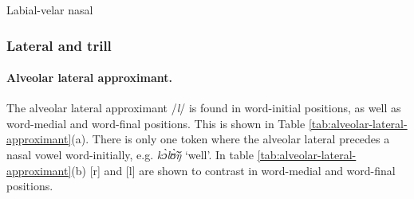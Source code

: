\begin{table}[!htb]
\small
\centering
\caption{Labial-velar nasal\label{tab:labialvelar-nasal}}

\quad
{}
\end{table}




\subsubsection{Lateral and trill}
\label{sec:approx}


\paragraph{Alveolar lateral approximant.}

The alveolar lateral approximant /{\it l}/ is found in word-initial positions, 
as well 
as word-medial and word-final positions. This is shown in Table 
\ref{tab:alveolar-lateral-approximant}(a).  There is only one token where the 
alveolar lateral precedes a nasal vowel word-initially, e.g. {\it kɔ̀lʊ̃̀ŋ́} 
`well'.    In table \ref{tab:alveolar-lateral-approximant}(b)  [r] and  [l] are 
shown to contrast in word-medial and word-final positions.

